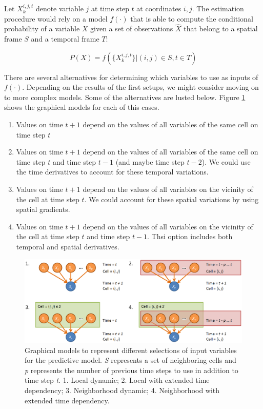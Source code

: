 \documentclass{article}
\begin{document}
Let $X_k^{i,j,t}$ denote variable $j$ at time step $t$ at coordinates $i, j$.
The estimation procedure would rely on a model $f(\cdot)$ that is able to
compute the conditional probability of a variable $X$ given a set of observations
$\hat{X}$ that belong to a spatial frame $S$ and a temporal frame $T$:

\begin{equation}
\label{eq:condProb}
P(X) = f(\{X_k^{i,j,t}\} | (i,j) \in S, t \in T)
\end{equation}

There are several alternatives for determining which variables to use as inputs
of $f(\cdot)$. Depending on the results of the first setups, we might consider
moving on to more complex models. Some of the alternatives are lusted below.
Figure \ref{fig:plate_models} shows the graphical models for each of this cases.

\begin{enumerate}
\item Values on time $t + 1$ depend on the values of all variables of the same
cell on time step $t$
\item Values on time $t + 1$ depend on the values of all variables of the same
cell on time step $t$ and time step $t - 1$ (and maybe time step $t- 2$). We
could use the time derivatives to account for these temporal variations.
\item Values on time $t + 1$ depend on the values of all variables on the
vicinity of the cell at time step $t$. We could account for these spatial
variations by using spatial gradients.
\item Values on time $t + 1$ depend on the values of all variables on the
vicinity of the cell at time step $t$ and time step $t -1$. Thsi option includes
both temporal and spatial derivatives.
\end{enumerate}

\begin{center}
\begin{figure}
\includegraphics[width=0.9\columnwidth]{images/plate_models.png}
\caption{Graphical models to represent different
selections of input variables for the predictive model. \textit{S} represents
a set of neighboring cells and \textit{p} represents the number of previous
time steps to use in addition to time step \textit{t}. 1.
Local dynamic; 2. Local with extended time dependency; 3.
Neighborhood dynamic; 4. Neighborhood with extended time
dependency.}\label{fig:plate_models}
\end{figure}
\end{center}
\end{document}
